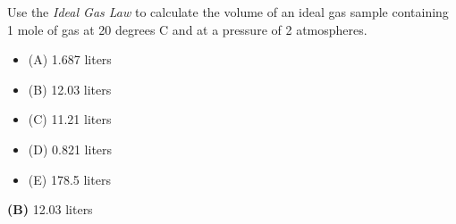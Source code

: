 

Use the {\it Ideal Gas Law} to calculate the volume of an ideal gas sample containing 1 mole of gas at 20 degrees C and at a pressure of 2 atmospheres. 

\begin{itemize}
\item{(A)} 1.687 liters
\vskip 5pt 
\item{(B)} 12.03 liters
\vskip 5pt 
\item{(C)} 11.21 liters
\vskip 5pt 
\item{(D)} 0.821 liters
\vskip 5pt 
\item{(E)} 178.5 liters
\end{itemize}







{\bf (B)} 12.03 liters
 










